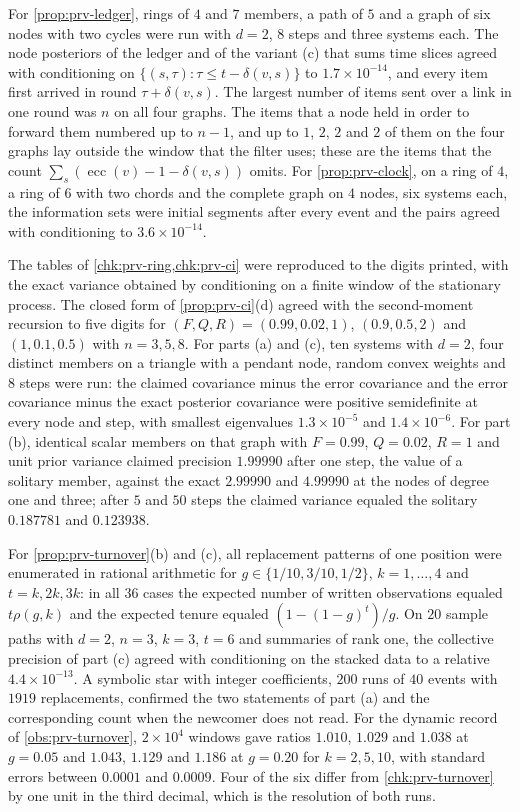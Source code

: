 \begin{numcheck}
For \cref{prop:prv-ledger}, rings of $4$ and $7$ members, a path of $5$ and a graph of six nodes with two cycles were run with $d=2$, $8$ steps and three systems each. The node posteriors of the ledger and of the variant (c) that sums time slices agreed with conditioning on $\{(s,\tau):\tau\le t-\delta(v,s)\}$ to $1.7\times10^{-14}$, and every item first arrived in round $\tau+\delta(v,s)$. The largest number of items sent over a link in one round was $n$ on all four graphs. The items that a node held in order to forward them numbered up to $n-1$, and up to $1$, $2$, $2$ and $2$ of them on the four graphs lay outside the window that the filter uses; these are the items that the count $\sum_s(\operatorname{ecc}(v)-1-\delta(v,s))$ omits. For \cref{prop:prv-clock}, on a ring of $4$, a ring of $6$ with two chords and the complete graph on $4$ nodes, six systems each, the information sets were initial segments after every event and the pairs agreed with conditioning to $3.6\times10^{-14}$.

The tables of \cref{chk:prv-ring,chk:prv-ci} were reproduced to the digits printed, with the exact variance obtained by conditioning on a finite window of the stationary process. The closed form of \cref{prop:prv-ci}(d) agreed with the second-moment recursion to five digits for $(F,Q,R)=(0.99,0.02,1)$, $(0.9,0.5,2)$ and $(1,0.1,0.5)$ with $n=3,5,8$. For parts (a) and (c), ten systems with $d=2$, four distinct members on a triangle with a pendant node, random convex weights and $8$ steps were run: the claimed covariance minus the error covariance and the error covariance minus the exact posterior covariance were positive semidefinite at every node and step, with smallest eigenvalues $1.3\times10^{-5}$ and $1.4\times10^{-6}$. For part (b), identical scalar members on that graph with $F=0.99$, $Q=0.02$, $R=1$ and unit prior variance claimed precision $1.99990$ after one step, the value of a solitary member, against the exact $2.99990$ and $4.99990$ at the nodes of degree one and three; after $5$ and $50$ steps the claimed variance equaled the solitary $0.187781$ and $0.123938$.

For \cref{prop:prv-turnover}(b) and (c), all replacement patterns of one position were enumerated in rational arithmetic for $g\in\{1/10,3/10,1/2\}$, $k=1,\dots,4$ and $t=k,2k,3k$: in all $36$ cases the expected number of written observations equaled $t\rho(g,k)$ and the expected tenure equaled $(1-(1-g)^t)/g$. On $20$ sample paths with $d=2$, $n=3$, $k=3$, $t=6$ and summaries of rank one, the collective precision of part (c) agreed with conditioning on the stacked data to a relative $4.4\times10^{-13}$. A symbolic star with integer coefficients, $200$ runs of $40$ events with $1919$ replacements, confirmed the two statements of part (a) and the corresponding count when the newcomer does not read. For the dynamic record of \cref{obs:prv-turnover}, $2\times10^{4}$ windows gave ratios $1.010$, $1.029$ and $1.038$ at $g=0.05$ and $1.043$, $1.129$ and $1.186$ at $g=0.20$ for $k=2,5,10$, with standard errors between $0.0001$ and $0.0009$. Four of the six differ from \cref{chk:prv-turnover} by one unit in the third decimal, which is the resolution of both runs.
\end{numcheck}

